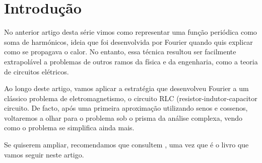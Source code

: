 \section{Introdução}
No anterior artigo desta série vimos como representar uma função periódica como soma de harmónicos, ideia que foi desenvolvida por Fourier quando quis explicar como se propagava o calor. No entanto, essa técnica resultou ser facilmente extrapolável a problemas de outros ramos da física e da engenharia, como a teoria de circuitos elétricos.

Ao longo deste artigo, vamos aplicar a estratégia que desenvolveu Fourier a um clássico problema de eletromagnetismo, o circuito RLC (resistor-indutor-capacitor circuito. De facto, após uma primeira aproximação utilizando senos e cossenos, voltaremos a olhar para o problema sob o prisma da análise complexa, vendo como o problema se simplifica ainda mais.

Se quiserem ampliar, recomendamos que consultem \cite{Sadiku}, uma vez que é o livro que vamos seguir neste artigo.

